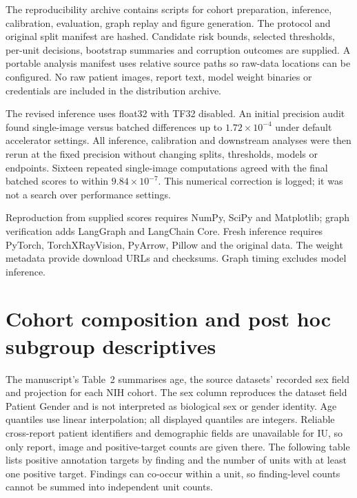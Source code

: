 \documentclass[10pt,a4paper]{article}
\begin{document}
The reproducibility archive contains scripts for cohort preparation, inference, calibration, evaluation, graph replay and figure generation. The protocol and original split manifest are hashed. Candidate risk bounds, selected thresholds, per-unit decisions, bootstrap summaries and corruption outcomes are supplied. A portable analysis manifest uses relative source paths so raw-data locations can be configured. No raw patient images, report text, model weight binaries or credentials are included in the distribution archive.

The revised inference uses float32 with TF32 disabled. An initial precision audit found single-image versus batched differences up to $1.72\times10^{-4}$ under default accelerator settings. All inference, calibration and downstream analyses were then rerun at the fixed precision without changing splits, thresholds, models or endpoints. Sixteen repeated single-image computations agreed with the final batched scores to within $9.84\times10^{-7}$. This numerical correction is logged; it was not a search over performance settings.

Reproduction from supplied scores requires NumPy, SciPy and Matplotlib; graph verification adds LangGraph and LangChain Core. Fresh inference requires PyTorch, TorchXRayVision, PyArrow, Pillow and the original data. The weight metadata provide download URLs and checksums. Graph timing excludes model inference.
\clearpage
\section{Cohort composition and post hoc subgroup descriptives}
The manuscript's Table~2 summarises age, the source datasets' recorded sex field and projection for each NIH cohort. The sex column reproduces the dataset field Patient Gender and is not interpreted as biological sex or gender identity. Age quantiles use linear interpolation; all displayed quantiles are integers. Reliable cross-report patient identifiers and demographic fields are unavailable for IU, so only report, image and positive-target counts are given there. The following table lists positive annotation targets by finding and the number of units with at least one positive target. Findings can co-occur within a unit, so finding-level counts cannot be summed into independent unit counts.

\end{document}
